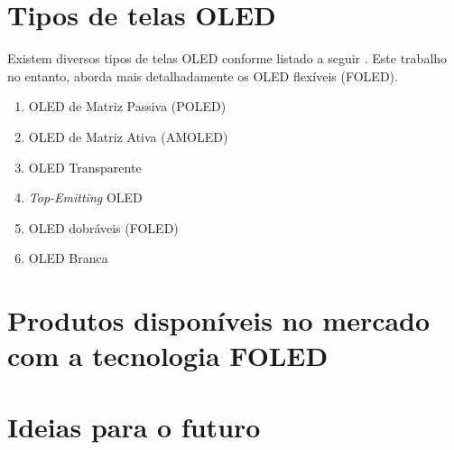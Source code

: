 \section{Tipos de telas OLED}
\label{sec:funcionamento}

Existem diversos tipos de telas OLED conforme listado a seguir \cite{HSWOLED}. Este trabalho no entanto, aborda mais detalhadamente os OLED flexíveis (FOLED).

\begin{enumerate}
	\item OLED de Matriz Passiva (POLED)
	\item OLED de Matriz Ativa (AMOLED)
	\item OLED Transparente 
	\item \textit{Top-Emitting} OLED 
	\item OLED dobráveis (FOLED)
	\item OLED Branca 
\end{enumerate}


\section{Produtos disponíveis no mercado com a tecnologia FOLED}
\label{sec:funcionamento}





\section{Ideias para o futuro}
\label{sec:funcionamento}













